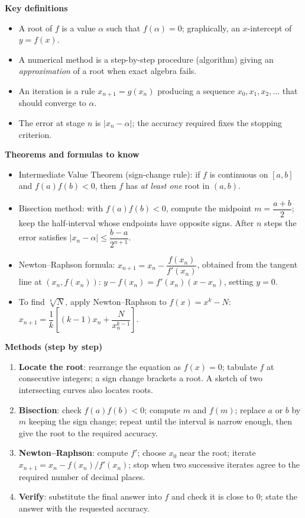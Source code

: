 \documentclass[11pt]{article}
\newcommand{\cle}[1]{{\popxbold\color{popdark}#1}}
\begin{document}
\begin{bilan}
\textbf{Key definitions}
\begin{itemize}
\item A \cle{root} of $f$ is a value $\alpha$ such that $f(\alpha)=0$; graphically, an $x$-intercept of $y=f(x)$.
\item A \cle{numerical method} is a step-by-step procedure (algorithm) giving an \emph{approximation} of a root when exact algebra fails.
\item An \cle{iteration} is a rule $x_{n+1}=g(x_n)$ producing a sequence $x_0,x_1,x_2,\dots$ that should converge to $\alpha$.
\item The \cle{error} at stage $n$ is $|x_n-\alpha|$; the accuracy required fixes the stopping criterion.
\end{itemize}

\textbf{Theorems and formulas to know}
\begin{itemize}
\item \cle{Intermediate Value Theorem} (sign-change rule): if $f$ is continuous on $[a,b]$ and $f(a)f(b)<0$, then $f$ has \emph{at least one} root in $(a,b)$.
\item \cle{Bisection method}: with $f(a)f(b)<0$, compute the midpoint $m=\dfrac{a+b}{2}$; keep the half-interval whose endpoints have opposite signs. After $n$ steps the error satisfies $|x_n-\alpha|\leq \dfrac{b-a}{2^{n+1}}$.
\item \cle{Newton--Raphson formula}: $x_{n+1}=x_n-\dfrac{f(x_n)}{f'(x_n)}$, obtained from the tangent line at $(x_n,f(x_n))$: $y-f(x_n)=f'(x_n)(x-x_n)$, setting $y=0$.
\item To find $\sqrt[k]{N}$, apply Newton--Raphson to $f(x)=x^k-N$: $x_{n+1}=\dfrac{1}{k}\left[(k-1)x_n+\dfrac{N}{x_n^{k-1}}\right]$.
\end{itemize}

\textbf{Methods (step by step)}
\begin{enumerate}
\item \textbf{Locate the root}: rearrange the equation as $f(x)=0$; tabulate $f$ at consecutive integers; a sign change brackets a root. A sketch of two intersecting curves also locates roots.
\item \textbf{Bisection}: check $f(a)f(b)<0$; compute $m$ and $f(m)$; replace $a$ or $b$ by $m$ keeping the sign change; repeat until the interval is narrow enough, then give the root to the required accuracy.
\item \textbf{Newton--Raphson}: compute $f'$; choose $x_0$ near the root; iterate $x_{n+1}=x_n-f(x_n)/f'(x_n)$; stop when two successive iterates agree to the required number of decimal places.
\item \textbf{Verify}: substitute the final answer into $f$ and check it is close to $0$; state the answer with the requested accuracy.
\end{enumerate}


\end{bilan}
\end{document}
